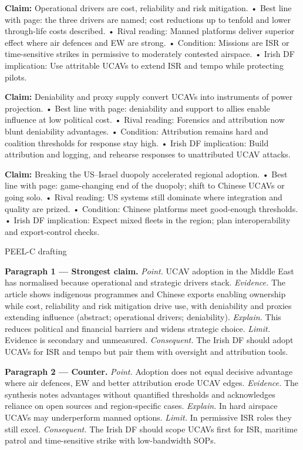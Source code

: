 \textbf{Claim:} Operational drivers are cost, reliability and risk mitigation.
• Best line with page: the three drivers are named; cost reductions up to tenfold and lower through-life costs described.
• Rival reading: Manned platforms deliver superior effect where air defences and EW are strong.
• Condition: Missions are ISR or time-sensitive strikes in permissive to moderately contested airspace.
• Irish DF implication: Use attritable UCAVs to extend ISR and tempo while protecting pilots.

\textbf{Claim:} Deniability and proxy supply convert UCAVs into instruments of power projection.
• Best line with page: deniability and support to allies enable influence at low political cost.
• Rival reading: Forensics and attribution now blunt deniability advantages.
• Condition: Attribution remains hard and coalition thresholds for response stay high.
• Irish DF implication: Build attribution and logging, and rehearse responses to unattributed UCAV attacks.

\textbf{Claim:} Breaking the US–Israel duopoly accelerated regional adoption.
• Best line with page: game-changing end of the duopoly; shift to Chinese UCAVs or going solo.
• Rival reading: US systems still dominate where integration and quality are prized.
• Condition: Chinese platforms meet good-enough thresholds.
• Irish DF implication: Expect mixed fleets in the region; plan interoperability and export-control checks.

PEEL-C drafting

\textbf{Paragraph 1 — Strongest claim.}
\textit{Point.} UCAV adoption in the Middle East has normalised because operational and strategic drivers stack.
\textit{Evidence.} The article shows indigenous programmes and Chinese exports enabling ownership while cost, reliability and risk mitigation drive use, with deniability and proxies extending influence (abstract; operational drivers; deniability).
\textit{Explain.} This reduces political and financial barriers and widens strategic choice.
\textit{Limit.} Evidence is secondary and unmeasured. \textit{Consequent.} The Irish DF should adopt UCAVs for ISR and tempo but pair them with oversight and attribution tools.

\textbf{Paragraph 2 — Counter.}
\textit{Point.} Adoption does not equal decisive advantage where air defences, EW and better attribution erode UCAV edges.
\textit{Evidence.} The synthesis notes advantages without quantified thresholds and acknowledges reliance on open sources and region-specific cases.
\textit{Explain.} In hard airspace UCAVs may underperform manned options.
\textit{Limit.} In permissive ISR roles they still excel. \textit{Consequent.} The Irish DF should scope UCAVs first for ISR, maritime patrol and time-sensitive strike with low-bandwidth SOPs.


